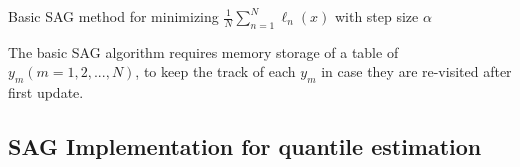 \begin{algorithm}
    \caption{Basic SAG method for minimizing $\frac{1}{N} \sum^N_{n=1}\ell_n(x)$ with step size $\alpha$}\label{alg:SAG_ori}
        \begin{algorithmic}[1]
                       
                                    
            \EndFor
        \end{algorithmic}
\end{algorithm}

The basic SAG algorithm requires memory storage of a table of $y_m (m= 1, 2, ...,N)$, to keep the track of each $y_m$ in case they are re-visited after first update.

\subsection{SAG Implementation for quantile estimation}

